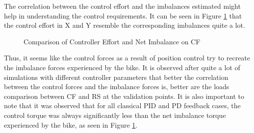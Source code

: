 The correlation between the control effort and the imbalances estimated might help in understanding the control requirements. It can be seen in Figure \ref{fig:imbVsCont} that the control effort in X and Y resemble the corresponding imbalances quite a lot. 
\begin{figure}[h!]
	\centering
	\scalebox{1}{
		\begin{tikzpicture}
			
	\end{tikzpicture}}
	\caption{Comparison of Controller Effort and Net Imbalance on CF}
	\label{fig:imbVsCont}
\end{figure}
Thus, it seems like the control forces as a result of position control try to recreate the imbalance forces experienced by the bike. It is observed after quite a lot of simulations with different controller parameters that better the correlation between the control forces and the imbalance forces is, better are the loads comparison between CF and RS at the validation points. It is also important to note that it was observed that for all classical PID and PD feedback cases, the control torque was always significantly less than the net imbalance torque experienced by the bike, as seen in Figure \ref{fig:imbVsCont}.
